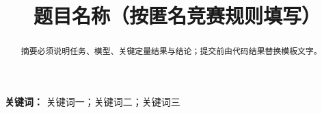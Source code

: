 \documentclass[12pt,a4paper]{article}
\title{题目名称（按匿名竞赛规则填写）}
\author{}
\date{}
\begin{document}
\maketitle
\begin{abstract}
摘要必须说明任务、模型、关键定量结果与结论；提交前由代码结果替换模板文字。
\end{abstract}
\noindent\textbf{关键词：} 关键词一；关键词二；关键词三








\appendix

\end{document}
